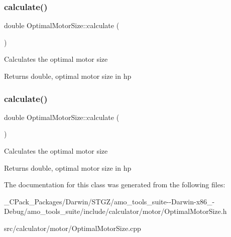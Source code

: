 \subsubsection{\texorpdfstring{calculate()}{calculate()}\hspace{0.1cm}{\footnotesize\ttfamily [2/3]}}
{\footnotesize\ttfamily double Optimal\+Motor\+Size\+::calculate (\begin{DoxyParamCaption}{ }\end{DoxyParamCaption})}

Calculates the optimal motor size \begin{DoxyReturn}{Returns}
double, optimal motor size in hp 
\end{DoxyReturn}
\mbox{\label{class_optimal_motor_size_aa9f4e68b9e1807d20e7738cd0789a539}} 
\subsubsection{\texorpdfstring{calculate()}{calculate()}\hspace{0.1cm}{\footnotesize\ttfamily [3/3]}}
{\footnotesize\ttfamily double Optimal\+Motor\+Size\+::calculate (\begin{DoxyParamCaption}{ }\end{DoxyParamCaption})}

Calculates the optimal motor size \begin{DoxyReturn}{Returns}
double, optimal motor size in hp 
\end{DoxyReturn}


The documentation for this class was generated from the following files\+:\begin{DoxyCompactItemize}
\item 
\+\_\+\+C\+Pack\+\_\+\+Packages/\+Darwin/\+S\+T\+G\+Z/amo\+\_\+tools\+\_\+suite-\/-\/\+Darwin-\/x86\+\_-\/\+Debug/amo\+\_\+tools\+\_\+suite/include/calculator/motor/Optimal\+Motor\+Size.\+h\item 
src/calculator/motor/Optimal\+Motor\+Size.\+cpp\end{DoxyCompactItemize}
